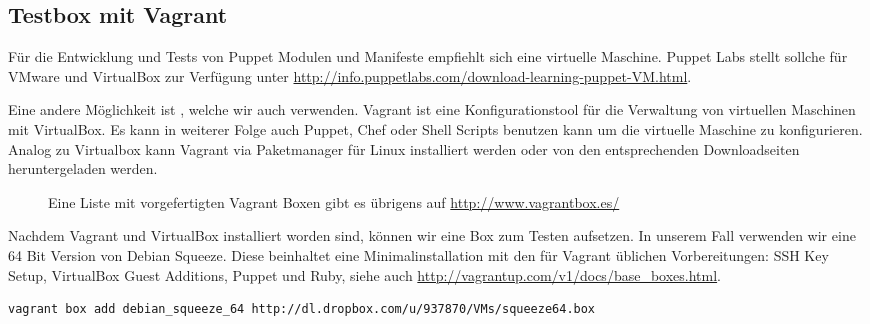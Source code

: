\documentclass[12pt,a4paper,ngerman]{article}
\begin{document}



\subsection{Testbox mit Vagrant}
Für die Entwicklung und Tests von Puppet Modulen und Manifeste empfiehlt sich eine virtuelle Maschine. Puppet Labs stellt sollche für VMware und VirtualBox zur Verfügung unter \url{http://info.puppetlabs.com/download-learning-puppet-VM.html}. 

Eine andere Möglichkeit ist \cite{vagrant}, welche wir auch verwenden. Vagrant ist eine Konfigurationstool für die Verwaltung von virtuellen Maschinen mit VirtualBox. Es kann in weiterer Folge auch Puppet, Chef oder Shell Scripts benutzen kann um die virtuelle Maschine zu konfigurieren. Analog zu Virtualbox kann Vagrant via Paketmanager für Linux installiert werden oder von den entsprechenden Downloadseiten heruntergeladen werden.


\begin{figure}
\vspace{-15pt}
\begin{boxedminipage}{5cm}
Eine Liste mit vorgefertigten Vagrant Boxen gibt es übrigens auf \url{http://www.vagrantbox.es/}
\end{boxedminipage}
\vspace{-15pt}
\end{figure}

Nachdem Vagrant und VirtualBox installiert worden sind, können wir eine Box zum Testen aufsetzen. In unserem Fall verwenden wir eine 64 Bit Version von Debian Squeeze. Diese beinhaltet eine Minimalinstallation mit den für Vagrant üblichen Vorbereitungen: SSH Key Setup, VirtualBox Guest Additions, Puppet und Ruby, siehe auch \url{http://vagrantup.com/v1/docs/base_boxes.html}.

\begin{lstlisting}[language=sh,caption=Download der Vagrant Box, label=vagrant-add]
vagrant box add debian_squeeze_64 http://dl.dropbox.com/u/937870/VMs/squeeze64.box
\end{lstlisting}
\end{document}
